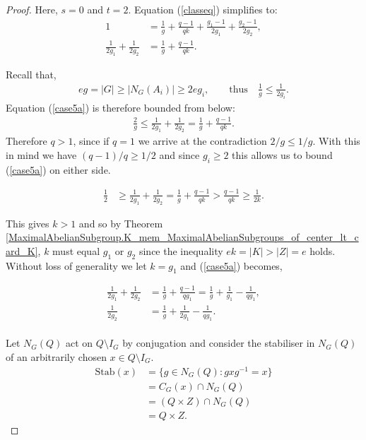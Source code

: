 \begin{proof} 
    Here, $s = 0$ and $t = 2$. Equation (\ref{classeq}) simplifies to:
\begin{align} \label{case5a} 1 &= \frac{1}{g} + \frac{q-1}{qk} + \frac{g_1 -1}{2g_1} + \frac{g_2 -1}{2g_2}, \nonumber
\\ 
\frac{1}{2g_1} + \frac{1}{2g_2} &= \frac{1}{g} + \frac{q-1}{qk}. \end{align}

Recall that,
\begin{align*} eg = |G| \geq  |N_G(A_i)| \geq 2eg_i, \qquad \text{thus} \quad \! \frac{1}{g} \leq \frac{1}{2g_i}.
\end{align*}
Equation (\ref{case5a}) is therefore bounded from below:
\begin{align*}  \frac{2}{g} \leq \frac{1}{2g_1} + \frac{1}{2g_2} = \frac{1}{g} + \frac{q-1}{qk}. 
\end{align*}
Therefore $q>1$, since if $q=1$ we arrive at the contradiction $2/g \leq 1/g$. With this in mind we have $(q-1)/q \geq 1/2$ and since $g_i \geq 2$ this allows us to bound (\ref{case5a}) on either side.

\begin{align*} \frac{1}{2} &\geq \frac{1}{2g_1} + \frac{1}{2g_2} = \frac{1}{g} + \frac{q-1}{qk} > \frac{q-1}{qk} \geq \frac{1}{2k}.
\end{align*}

This gives $k > 1$ and so by Theorem \ref{MaximalAbelianSubgroup.K_mem_MaximalAbelianSubgroups_of_center_lt_card_K}, $k$ must equal $g_1$ or $g_2$ since the inequality $ek = |K| > |Z| = e$ holds. Without loss of generality we let $k=g_1$ and (\ref{case5a}) becomes,

\begin{align} \label{case5b} \frac{1}{2g_1} + \frac{1}{2g_2} &= \frac{1}{g} + \frac{q-1}{qg_1} = \frac{1}{g} + \frac{1}{g_1} - \frac{1}{qg_1}, \nonumber \\[1.5ex]
 \frac{1}{2g_2} &= \frac{1}{g} + \frac{1}{2g_1} - \frac{1}{qg_1}.
\end{align}
\\
Let $N_G(Q)$ act on $Q \! \setminus \! I_G$ by conjugation and consider the stabiliser in $N_G(Q)$ of an arbitrarily chosen $x \in Q \! \setminus \! I_G$.
\begin{align*} \text{Stab}(x) &= \{ g \in N_G(Q) : g x g^{-1} = x \}
\\ &= C_G(x) \cap N_G(Q)
\\ &= (Q \times Z) \cap N_G(Q) %
\\ &= Q \times Z. \tag{since $Q \times Z \subset N_G(Q)$}
\end{align*}


\end{proof}
